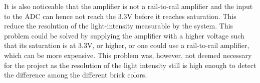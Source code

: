 It is also noticeable that the amplifier is not a rail-to-rail amplifier and the input to the ADC can hence not reach the 3.3V before it reaches saturation.
This reduce the resolution of the light-intensity measurable by the system.
This problem could be solved by supplying the amplifier with a higher voltage such that its saturation is at 3.3V, or higher, or one could use a rail-to-rail amplifier, which can be more expensive.
This problem was, however, not deemed necessary for the project as the resolution of the light intensity still is high enough to detect the difference among the different brick colors.




